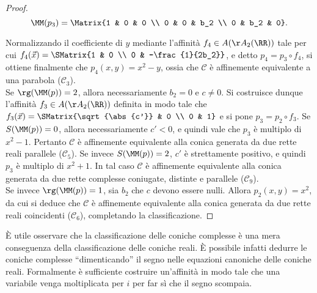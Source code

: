 \documentclass[11pt]{article}
\begin{document}
\begin{proof}
		\[ \MM(p_3) = \Matrix{1 & 0 & 0 \\ 0 & 0 & b_2 \\ 0 & b_2 & 0}. \]
		
		\vskip 0.05in
		
		Normalizzando il coefficiente di $y$ mediante
		l'affinità $f_4 \in A(\AA_2(\RR))$ tale per cui $f_4(\vec x) = \SMatrix{1 & 0 \\ 0 & -\frac{1}{2b_2}}$,
		e detto $p_4 = p_3 \circ f_4$, si ottiene finalmente
		che $p_4(x, y) = x^2 - y$, ossia che $\mathcal{C}$ è
		affinemente equivalente a una parabola ($\mathcal{C}_3$). \\
		
		Se $\rg(\MM(p)) = 2$, allora necessariamente
		$b_2 = 0$ e $c \neq 0$. Si costruisce dunque
		l'affinità $f_3 \in A(\AA_2(\RR))$ definita in
		modo tale che $f_3(\vec x) = \SMatrix{\sqrt{\abs{c'}} & 0 \\ 0 & 1}$ e si pone
		$p_3 = p_2 \circ f_3$. Se $S(\MM(p)) = 0$, allora necessariamente $c' < 0$, e quindi vale che $p_3$ è multiplo di $x^2 - 1$. Pertanto $\mathcal{C}$ è affinemente
		equivalente alla conica generata da due rette reali parallele ($\mathcal{C}_5$). Se invece $S(\MM(p)) = 2$, $c'$ è strettamente positivo, e quindi $p_3$ è
		multiplo di $x^2 + 1$. In tal caso $\mathcal{C}$ è affinemente equivalente alla conica
		generata da due rette complesse coniugate, distinte e parallele ($\mathcal{C}_9$). \\
		
		Se invece $\rg(\MM(p)) = 1$, sia $b_2$ che $c$ devono
		essere nulli. Allora $p_2(x, y) = x^2$, da cui
		si deduce che $\mathcal{C}$ è affinemente
		equivalente alla conica generata da due rette
		reali coincidenti ($\mathcal{C}_6$), completando la classificazione.
	\end{proof}

	\begin{remark}
		È utile osservare che la classificazione delle
		coniche complesse è una mera conseguenza della
		classificazione delle coniche reali. È possibile
		infatti dedurre le coniche complesse
		``dimenticando'' il segno nelle equazioni canoniche
		delle coniche reali. Formalmente è sufficiente
		costruire un'affinità in modo tale che una variabile
		venga moltiplicata per $i$ per far sì che il segno
		scompaia.
	\end{remark}
\end{document}
